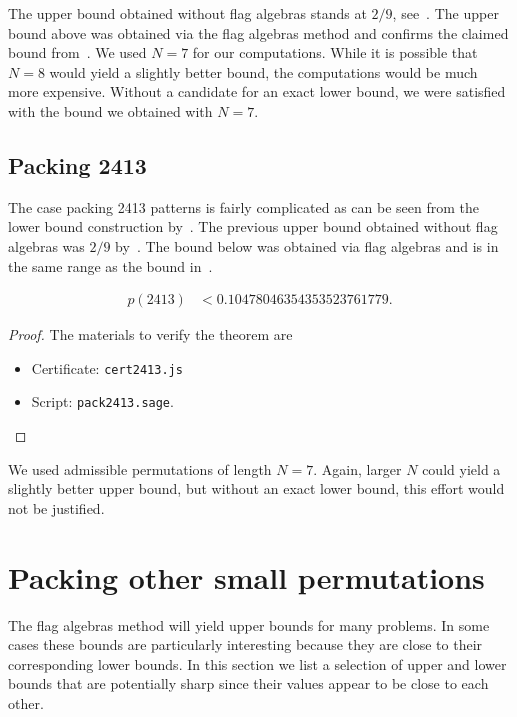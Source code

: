  The upper bound obtained without flag algebras stands at $2/9$, see~\cite{albert2002packing}. The upper bound above was obtained via the flag algebras method and confirms the claimed bound from~\cite{balogh2015minimum}. We used $N = 7$ for our computations. While it is possible that $N=8$ would yield a slightly better bound, the computations would be much more expensive. Without a candidate for an exact lower bound, we were satisfied with the bound we obtained with $N=7$.

\subsection{Packing 2413}
\label{sec:pack2413}
The case packing 2413 patterns is fairly complicated as can be seen from the lower bound construction by~\cite{presutti2010packing}. The previous upper bound obtained without flag algebras was $2/9$ by~\cite{albert2002packing}. The bound below was obtained via flag algebras and is in the same range as the bound in~\cite{balogh2015minimum}. 
\begin{theorem}
\label{thm:high2413}
\begin{align*}
p(2413) &< 0.10478046354353523761779.
\end{align*}
\end{theorem}
\begin{proof} The materials to verify the theorem are
  \begin{itemize}
    \item Certificate: \texttt{cert2413.js}
    \item Script: \texttt{pack2413.sage}.
  \end{itemize}
\end{proof}

We used admissible permutations of length $N=7$. Again, larger $N$ could yield a slightly better upper bound, but without an exact lower bound, this effort would not be justified.


\section{Packing other small permutations}
\label{sec:packingsmall}

The flag algebras method will yield upper bounds for many problems. In some cases these bounds are particularly interesting because they are close to their corresponding lower bounds. In this section we list a selection of upper and lower bounds that are potentially sharp since their values appear to be close to each other. 

